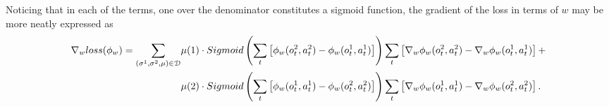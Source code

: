 \begin{answer}
  Noticing that in each of the terms, one over the denominator constitutes a sigmoid function, the gradient of the loss in terms of $w$
  may be more neatly expressed as
  \begin{align}
    \nabla_{w} loss(\phi_{w}) = \sum_{(\sigma^{1}, \sigma^{2}, \mu) \in {\cal D}} &\mu(1) \cdot Sigmoid \left(\sum_{t}\left[\phi_{w}(o^{2}_{t}, a^{2}_{t}) - \phi_{w}(o^{1}_{t}, a^{1}_{t})\right]\right) \sum_{t}\left[\nabla_{w}\phi_{w}(o^{2}_{t}, a^{2}_{t}) - \nabla_{w}\phi_{w}(o^{1}_{t}, a^{1}_{t})\right] + \\ &\mu(2) \cdot Sigmoid\left(\sum_{t}\left[\phi_{w}(o^{1}_{t}, a^{1}_{t}) - \phi_{w}(o^{2}_{t}, a^{2}_{t})\right]\right) \sum_{t}\left[\nabla_{w}\phi_{w}(o^{1}_{t}, a^{1}_{t}) - \nabla_{w}\phi_{w}(o^{2}_{t}, a^{2}_{t})\right].
  \end{align}
  \cite{NIPS2017_d5e2c0ad}
  \cite{19ff28b9-64f9-3656-ba40-08326a05748e}
\end{answer}

